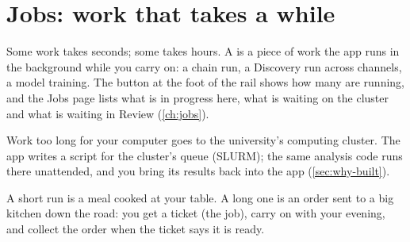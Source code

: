 \section{Jobs: work that takes a while}\label{sec:core-ideas-jobs}
Some work takes seconds; some takes hours. A  is a piece of work the app runs
in the background while you carry on: a chain run, a Discovery run across channels, a model
training. The  button at the foot of the rail shows how many are running, and the
Jobs page lists what is in progress here, what is waiting on the cluster and what is waiting
in Review (\cref{ch:jobs}).

Work too long for your computer goes to the university's computing cluster. The app writes a
script for the cluster's queue (SLURM); the same analysis code runs there unattended, and
you bring its results back into the app (\cref{sec:why-built}).

\begin{plainterms}
A short run is a meal cooked at your table. A long one is an order sent to a big kitchen
down the road: you get a ticket (the job), carry on with your evening, and collect the order
when the ticket says it is ready.
\end{plainterms}
